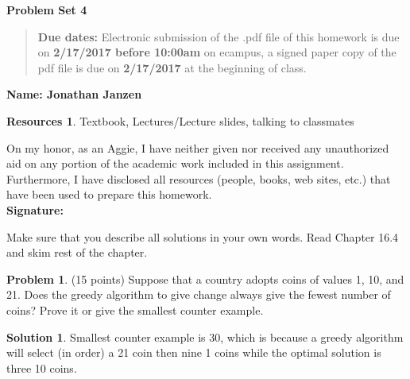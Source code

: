 \documentclass{article}
\theoremstyle{definition}
\newtheorem{problem}{Problem}
\newtheorem*{solution}{Solution}
\newtheorem*{resources}{Resources}
\newcommand{\name}[1]{\noindent\textbf{Name: #1}}
\newcommand{\honor}{\noindent On my honor, as an Aggie, I have neither
  given nor received any unauthorized aid on any portion of the
  academic work included in this assignment. Furthermore, I have
  disclosed all resources (people, books, web sites, etc.) that have
  been used to prepare this homework. \\[1ex]
 \textbf{Signature:} \underline{\hspace*{5cm}} }
\newcommand{\problemset}[1]{\begin{center}\textbf{Problem Set #1}\end{center}}
\newcommand{\duedate}[2]{\begin{quote}\textbf{Due dates:} Electronic
    submission of the .pdf file of this homework is due on \textbf{#1} on ecampus, a signed paper copy
    of the pdf file is due on \textbf{#2} at the beginning of
    class. \end{quote} }
\begin{document}
\problemset{4}
\duedate{2/17/2017 before 10:00am}{2/17/2017}
\name{Jonathan Janzen}
\begin{resources} Textbook, Lectures/Lecture slides, talking to classmates
\end{resources}
\honor

\newpage
\noindent Make sure that you describe all solutions in your own words. Read Chapter 16.4 and skim rest of the chapter. \medskip


\begin{problem} (15 points)
Suppose that a country adopts coins of values 1, 10, and 21. Does the
greedy algorithm to give change always give the fewest number of
coins?  Prove it or give the smallest counter example. 
\end{problem}
\begin{solution}
Smallest counter example is $30$, which is because a greedy algorithm will select (in order) a 21 coin then nine 1 coins while the optimal solution is three 10 coins.
\end{solution}
\end{document}
